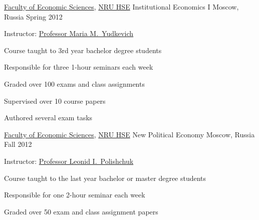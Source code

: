 \begin{cventries}
  \cventry
    {\href{https://economics.hse.ru/en/}{Faculty of Economic Sciences}, \href{http://www.hse.ru/en/}{NRU HSE}} %
    {Institutional Economics I} %
    {Moscow, Russia} %
    {Spring 2012} %
    {
      \begin{cvitems} %
        \item {Instructor: \href{https://www.hse.ru/en/staff/yudkevich}{Professor Maria M.~Yudkevich}}
        \item {Course taught to 3rd year bachelor degree students}
        \item {Responsible for three 1-hour seminars each week}
        \item {Graded over 100 exams and class assignments}
        \item {Supervised over 10 course papers}
        \item {Authored several exam tasks}
      \end{cvitems}
    }

  \cventry
    {\href{https://economics.hse.ru/en/}{Faculty of Economic Sciences}, \href{http://www.hse.ru/en/}{NRU HSE}} %
    {New Political Economy} %
    {Moscow, Russia} %
    {Fall 2012} %
    {
      \begin{cvitems} %
        \item {Instructor: \href{http://www.hse.ru/en/org/persons/65104}{Professor Leonid I.~Polishchuk}}
        \item {Course taught to the last year bachelor or master degree students}
        \item {Responsible for one 2-hour seminar each week}
        \item {Graded over 50 exam and class assignment papers}
      \end{cvitems}
    }

\end{cventries}
